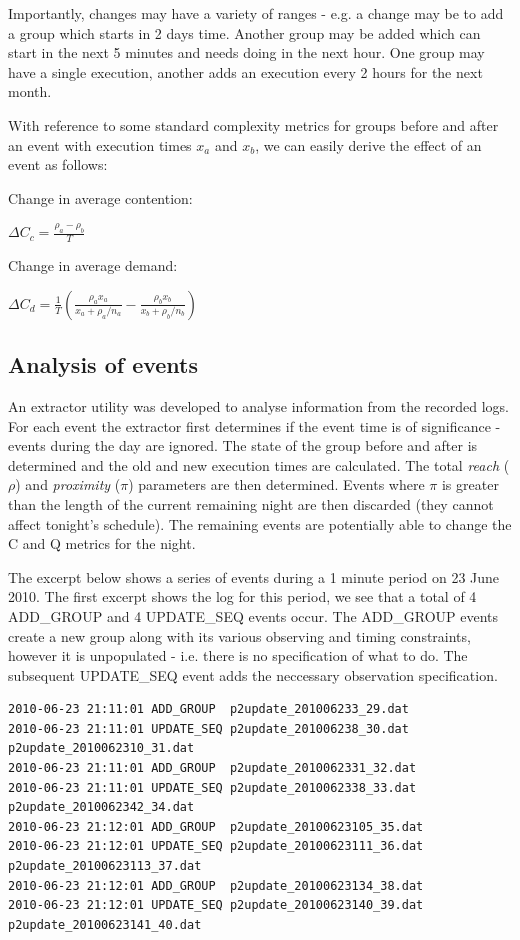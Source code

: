 Importantly, changes may have a variety of ranges - e.g. a change may be to add a group which starts in 2 days time. Another group may be added which can start in the next 5 minutes and needs doing in the next hour. One group may have a single execution, another adds an execution every 2 hours for the next month.

With reference to some standard complexity metrics for groups before and after an event with execution times $x_a$ and $x_b$, we can easily derive the effect of an event as follows:

Change in average contention:

$\Delta C_c = \frac{\rho_a - \rho_b}{T}$

Change in average demand:

$\Delta C_d  = \frac{1}{T} \left (\frac{\rho_a x_a}{x_a+\rho_a / n_a} -  \frac{\rho_b x_b}{x_b+\rho_b / n_b} \right) $

\subsection{Analysis of events}
\label{sect:volanal}
An extractor utility was developed to analyse information from the recorded logs. For each event the extractor first determines if the event time is of significance - events during the day are ignored. The state of the group before and after is determined and the old and new execution times are calculated. The total \emph{reach} ($\rho$) and \emph{proximity} ($\pi$) parameters are then determined. Events where $\pi$ is greater than the length of the current remaining night are then discarded (they cannot affect tonight's schedule). The remaining events are potentially able to change the C and Q metrics for the night. 


The excerpt below shows a series of events during a 1 minute period on 23 June 2010. The first excerpt shows the log for this period, we see that a total of 4  \textsc{ADD\_GROUP} and 4 \textsc{UPDATE\_SEQ} events occur. The \textsc{ADD\_GROUP} events create a new group along with its various observing and timing constraints, however it is unpopulated - i.e. there is no specification of what to do. The subsequent \textsc{UPDATE\_SEQ} event adds the neccessary observation specification.

\scriptsize
\begin{verbatim}
2010-06-23 21:11:01 ADD_GROUP  p2update_201006233_29.dat
2010-06-23 21:11:01 UPDATE_SEQ p2update_201006238_30.dat   p2update_2010062310_31.dat
2010-06-23 21:11:01 ADD_GROUP  p2update_2010062331_32.dat
2010-06-23 21:11:01 UPDATE_SEQ p2update_2010062338_33.dat  p2update_2010062342_34.dat
2010-06-23 21:12:01 ADD_GROUP  p2update_20100623105_35.dat
2010-06-23 21:12:01 UPDATE_SEQ p2update_20100623111_36.dat p2update_20100623113_37.dat
2010-06-23 21:12:01 ADD_GROUP  p2update_20100623134_38.dat
2010-06-23 21:12:01 UPDATE_SEQ p2update_20100623140_39.dat p2update_20100623141_40.dat
\end{verbatim}
\normalsize


